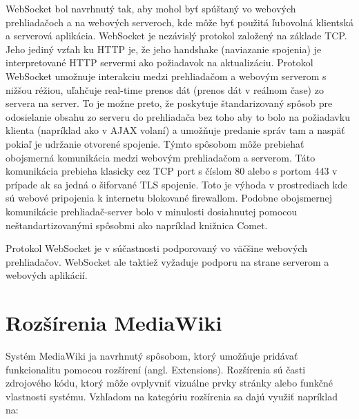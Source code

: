 WebSocket bol navrhnutý tak, aby mohol byť spúštaný vo webových prehliadačoch a na webových serveroch, kde môže byť použitá ľubovolná  klientská a serverová aplikácia. WebSocket je nezávislý protokol založený na základe TCP. Jeho jediný vzťah ku HTTP je, že jeho handshake (naviazanie spojenia) je interpretované HTTP servermi ako požiadavok na aktualizáciu. Protokol WebSocket umožnuje interakciu medzi prehliadačom a webovým serverom s nižšou réžiou, uľahčuje real-time prenos dát (prenos dát v reálnom čase) zo servera na server. To je možne preto, že poskytuje štandarizovaný spôsob pre odosielanie obsahu zo serveru do prehliadača bez toho aby to bolo na požiadavku klienta (napríklad ako v AJAX volaní) a umožňuje predanie správ tam a naspäť pokiaľ je udržanie otvorené spojenie. Týmto spôsobom môže prebiehať obojsmerná komunikácia medzi webovým prehliadačom a serverom. Táto komunikácia prebieha klasicky cez TCP port s číslom 80 alebo s portom 443 v prípade ak sa jedná o šiforvané TLS spojenie. Toto je výhoda v prostrediach kde sú webové pripojenia k internetu blokované firewallom. Podobne obojsmernej komunikácie prehliadač-server bolo v minulosti dosiahnutej pomocou neštandartizovanými spôsobmi ako napríklad knižnica Comet.

Protokol WebSocket je v súčastnosti podporovaný vo väčšine webových prehliadačov. WebSocket ale taktiež vyžaduje podporu na strane serverom a webových aplikácií.

\section{Rozšírenia MediaWiki}

Systém MediaWiki ja navrhnutý spôsobom, ktorý umožňuje pridávať funkcionalitu pomocou rozšírení (angl. Extensions). Rozšírenia sú časti zdrojového kódu, ktorý môže ovplyvniť vizuálne prvky stránky alebo funkčné vlastnosti systému. Vzhľadom na kategóriu rozšírenia sa dajú využiť napríklad na:

